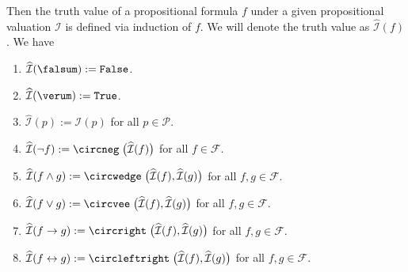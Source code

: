 \begin{table}[!ht]
  \centering
{}
  \caption{Interpretation of the propositional operators.}
  \label{tab:aussagen-logik}
\end{table}
Then the truth value of a propositional formula $f$ under a given propositional valuation $\mathcal{I}$ is
defined via induction of $f$.  We will denote the truth value as
$\widehat{\mathcal{I}}(f)$ .  We have
\begin{enumerate}
\item $\widehat{\mathcal{I}}(\falsum) := \texttt{False}$.
\item $\widehat{\mathcal{I}}(\verum) := \texttt{True}$.
\item $\widehat{\mathcal{I}}(p) := \mathcal{I}(p)$ for all $p \in \mathcal{P}$.
\item $\widehat{\mathcal{I}}(\neg f) := \circneg\;\bigl(\widehat{\mathcal{I}}(f)\bigr)$ for all $f \in \mathcal{F}$.
\item $\widehat{\mathcal{I}}(f \wedge g) := \circwedge\;\bigl(\widehat{\mathcal{I}}(f), \widehat{\mathcal{I}}(g)\bigr)$ 
      for all $f, g \in \mathcal{F}$.
\item $\widehat{\mathcal{I}}(f \vee g) := \circvee\;\bigl(\widehat{\mathcal{I}}(f), \widehat{\mathcal{I}}(g)\bigr)$ 
      for all $f, g \in \mathcal{F}$.
\item $\widehat{\mathcal{I}}(f \rightarrow g) := \circright\;\bigl(\widehat{\mathcal{I}}(f), \widehat{\mathcal{I}}(g)\bigr)$ 
      for all $f, g \in \mathcal{F}$.
\item $\widehat{\mathcal{I}}(f \leftrightarrow g) := \circleftright\;\bigl(\widehat{\mathcal{I}}(f), \widehat{\mathcal{I}}(g)\bigr)$ 
      for all $f, g \in \mathcal{F}$.
\end{enumerate}
